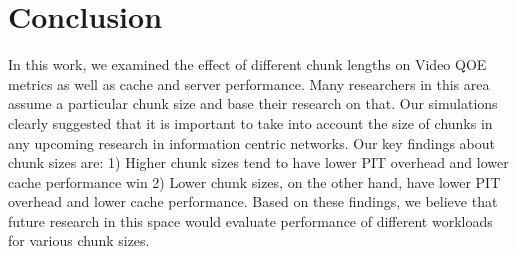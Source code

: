 \section{Conclusion} \label{sec:conclusion}

In this work, we examined the effect of different chunk lengths on
Video QOE metrics as well as cache and server performance. Many
researchers in this area assume a particular chunk size and base their
research on that. Our simulations clearly suggested that it is
important to take into account the size of chunks in any upcoming
research in information centric networks. Our key findings about chunk
sizes are: 1) Higher chunk sizes tend to have lower PIT overhead and
lower cache performance win 2) Lower chunk sizes, on the other hand,
have lower PIT overhead and lower cache performance. Based on these
findings, we believe that future research in this space would evaluate
performance of different workloads for various chunk sizes.
